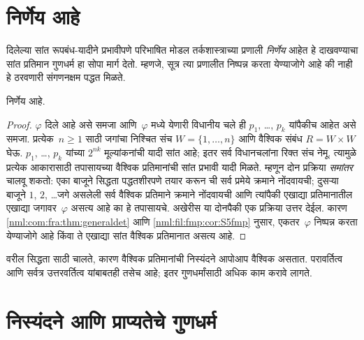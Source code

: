 \section{ निर्णेय आहे}\label{nml:fil:dec:sec}
दिलेल्या सांत रूपबंध-यादीने प्रभावीपणे परिभाषित मोडल तर्कशास्त्राच्या
प्रणाली \emph{निर्णेय} आहेत हे दाखवण्याचा
सांत प्रतिमान गुणधर्म हा सोपा मार्ग देतो.
म्हणजे, सूत्र त्या प्रणालीत
निष्पन्न करता येण्याजोगे आहे की नाही हे ठरवणारी
संगणनक्षम पद्धत मिळते.

\begin{thm}
   निर्णेय आहे.
\end{thm}

\begin{proof}
  $\varphi$ दिले आहे असे समजा आणि~$\varphi$ मध्ये येणारी
  विधानीय चले ही $p_1$, \dots, $p_k$
  यांपैकीच आहेत असे समजा. प्रत्येक~$n\geq1$ साठी
  जगांचा निश्चित संच $W=\{1,\ldots,n\}$ आणि वैश्विक संबंध
  $R=W\times W$ घेऊ. $p_1$, \dots, $p_k$ यांच्या $2^{nk}$
  मूल्यांकनांची यादी सांत आहे; इतर सर्व विधानचलांना रिक्त संच नेमू.
  त्यामुळे प्रत्येक आकारासाठी तपासायच्या वैश्विक प्रतिमानांची सांत
  प्रभावी यादी मिळते.
  म्हणून दोन प्रक्रिया \emph{समांतर} चालवू शकतो:
  एका बाजूने सिद्धता पद्धतशीरपणे तयार करून
   ची सर्व प्रमेये क्रमाने नोंदवायची;
  दुसऱ्या बाजूने $1$, $2$, \dots जगे असलेली सर्व
  वैश्विक प्रतिमाने क्रमाने नोंदवायची आणि त्यांपैकी
  एखाद्या प्रतिमानातील एखाद्या जगावर~$\varphi$ असत्य
  आहे का हे तपासायचे. अखेरीस या दोनपैकी एक
  प्रक्रिया उत्तर देईल. कारण
  \ref{nml:com:fra:thm:generaldet} आणि
  \ref{nml:fil:fmp:cor:S5fmp} नुसार, एकतर~$\varphi$
  निष्पन्न करता येण्याजोगे आहे किंवा ते एखाद्या सांत
  वैश्विक प्रतिमानात असत्य आहे.
\end{proof}

वरील सिद्धता  साठी चालते, कारण
वैश्विक प्रतिमानांची निस्यंदने आपोआप वैश्विक
असतात. परावर्तित्व आणि सर्वत्र उत्तरवर्तित्व
यांबाबतही तसेच आहे; इतर गुणधर्मांसाठी अधिक
काम करावे लागते.













\section{निस्यंदने आणि प्राप्यतेचे गुणधर्म}\label{nml:fil:acc:sec}

